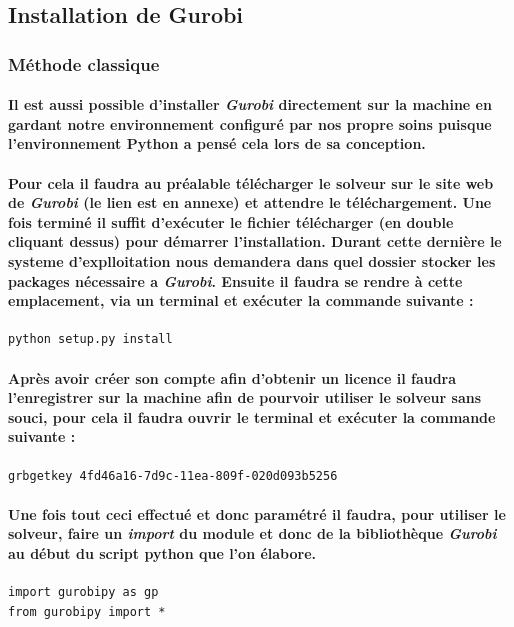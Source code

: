 \documentclass[a4paper, 12pt, twoside]{article}
\begin{document}
\subsection{Installation de Gurobi}
\subsubsection{Méthode classique }
\paragraph{Il est aussi possible d'installer \textit{Gurobi} directement sur la machine en gardant notre environnement configuré par nos propre soins puisque l'environnement Python a pensé cela lors de sa conception. }
\paragraph{Pour cela il faudra au préalable télécharger le solveur sur le site web de \textit{Gurobi} (le lien est en annexe) et attendre le téléchargement. Une fois terminé il suffit d'exécuter le fichier télécharger (en double cliquant dessus) pour démarrer l'installation. Durant cette dernière le systeme d'explloitation nous demandera dans quel dossier stocker les packages nécessaire a \textit{Gurobi}. Ensuite il faudra se rendre à cette emplacement, via un terminal et exécuter la commande suivante : }
\begin{verbatim}
python setup.py install
\end{verbatim}
\paragraph{Après avoir créer son compte afin d'obtenir un licence il faudra l'enregistrer sur la machine afin de pourvoir utiliser le solveur sans souci, pour cela il faudra ouvrir le terminal et exécuter la commande suivante :}
\begin{verbatim}
grbgetkey 4fd46a16-7d9c-11ea-809f-020d093b5256
\end{verbatim}
\paragraph{Une fois tout ceci effectué et donc paramétré il faudra, pour utiliser le solveur, faire un \textit{import} du module et donc de la bibliothèque \textit{Gurobi} au début du script python que l'on élabore.}
\begin{verbatim}
import gurobipy as gp
from gurobipy import *
\end{verbatim}
\end{document}
